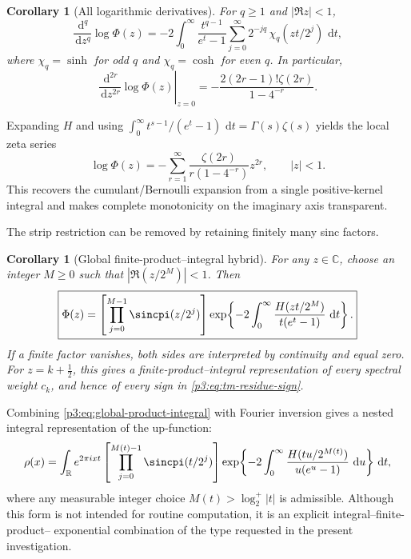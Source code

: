 \documentclass[11pt,oneside]{article}
\newtheorem{corollary}[theorem]{Corollary}
\theoremstyle{definition}
\newcommand{\dd}{\,\mathrm d}
\newcommand{\C}{\mathbb C}
\begin{document}
\begin{corollary}[All logarithmic derivatives]
\label{p3:cor:malmsten-derivatives}
For \(q\ge1\) and \(|\Re z|<1\),
\begin{equation}
 \frac{\dd^q}{\dd z^q}\log\Phi(z)
 =-2\int_0^\infty\frac{t^{q-1}}{e^t-1}
   \sum_{j=0}^{\infty}2^{-jq}\,\chi_q(zt/2^j)\,\dd t,      \label{p3:eq:logPhi-deriv-integral}
\end{equation}
where \(\chi_q=\sinh\) for odd \(q\) and \(\chi_q=\cosh\) for even \(q\).
In particular,
\begin{equation}
 \left.\frac{\dd^{2r}}{\dd z^{2r}}\log\Phi(z)\right|_{z=0}
 =-\frac{2(2r-1)!\zeta(2r)}{1-4^{-r}}.                    \label{p3:eq:logPhi-even-jet}
\end{equation}
\end{corollary}

Expanding \(H\) and using
\(\int_0^\infty t^{s-1}/(e^t-1)\,\dd t=\Gamma(s)\zeta(s)\)
yields the local zeta series
\begin{equation}
 \log\Phi(z)
 =-\sum_{r=1}^{\infty}
   \frac{\zeta(2r)}{r(1-4^{-r})}z^{2r},
 \qquad |z|<1.                                             \label{p3:eq:logPhi-zeta-series}
\end{equation}
This recovers the cumulant/Bernoulli expansion from a single positive-kernel integral and
makes complete monotonicity on the imaginary axis transparent.

The strip restriction can be removed by retaining finitely many sinc factors.

\begin{corollary}[Global finite-product--integral hybrid]
\label{p3:cor:global-hybrid}
For any \(z\in\C\), choose an integer \(M\ge0\) such that
\(|\Re(z/2^M)|<1\).  Then
\begin{equation}
\boxed{
 \Phi(z)=
 \left[\prod_{j=0}^{M-1}\sincpi(z/2^j)\right]
 \exp\!\left\{-2\int_0^\infty
 \frac{H(zt/2^M)}{t(e^t-1)}\,\dd t\right\}.}             \label{p3:eq:global-product-integral}
\end{equation}
If a finite factor vanishes, both sides are interpreted by continuity and equal zero.
For \(z=k+\tfrac12\), this gives a finite-product--integral representation of every
spectral weight \(c_k\), and hence of every sign in \eqref{p3:eq:tm-residue-sign}.
\end{corollary}

Combining \eqref{p3:eq:global-product-integral} with Fourier inversion gives a nested
integral representation of the up-function:
\begin{equation}
 \rho(x)=\int_{\mathbb R}e^{2\pi ixt}
 \left[\prod_{j=0}^{M(t)-1}\sincpi(t/2^j)\right]
 \exp\!\left\{-2\int_0^\infty
 \frac{H(tu/2^{M(t)})}{u(e^u-1)}\,\dd u\right\}\dd t,     \label{p3:eq:rho-nested-malmsten}
\end{equation}
where any measurable integer choice \(M(t)>\log_2^+|t|\) is admissible.  Although this
form is not intended for routine computation, it is an explicit integral--finite-product--
exponential combination of the type requested in the present investigation.
\end{document}
